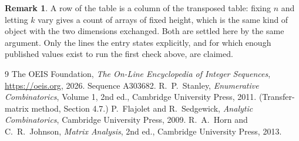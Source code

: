 \documentclass[11pt,a4paper]{article}
\theoremstyle{plain}
\theoremstyle{definition}
\newtheorem{remark}[theorem]{Remark}
\begin{document}
\begin{remark}
A row of the table is a column of the transposed table: fixing $n$ and letting $k$ vary gives a
count of arrays of fixed height, which is the same kind of object with the two dimensions
exchanged. Both are settled here by the same argument. Only the lines the entry states
explicitly, and for which enough published values exist to run the first check above, are
claimed.
\end{remark}

\begin{thebibliography}{9}
 The OEIS Foundation, \emph{The On-Line Encyclopedia of Integer
Sequences}, \url{https://oeis.org}, 2026. Sequence A303682.
 R.~P.~Stanley, \emph{Enumerative Combinatorics}, Volume 1, 2nd ed.,
Cambridge University Press, 2011. (Transfer-matrix method, Section 4.7.)
 P.~Flajolet and R.~Sedgewick, \emph{Analytic Combinatorics}, Cambridge
University Press, 2009.
 R.~A.~Horn and C.~R.~Johnson, \emph{Matrix Analysis}, 2nd ed., Cambridge
University Press, 2013.
\end{thebibliography}
\end{document}
